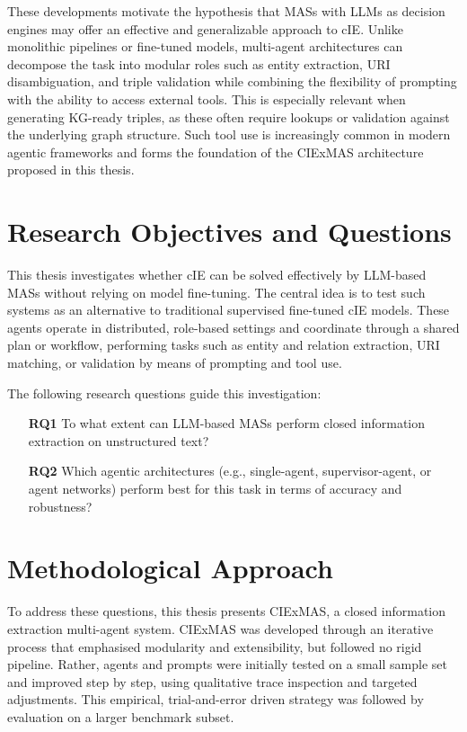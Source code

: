 \documentclass[a4paper,oneside,bibliography=totoc]{scrbook}
\begin{document}
These developments motivate the hypothesis that \acp{MAS} with \acp{LLM} as decision engines may offer an effective and generalizable approach to \ac{cIE}. Unlike monolithic pipelines or fine-tuned models, multi-agent architectures can decompose the task into modular roles such as entity extraction, URI disambiguation, and triple validation while combining the flexibility of prompting with the ability to access external tools. This is especially relevant when generating \ac{KG}-ready triples, as these often require lookups or validation against the underlying graph structure. Such tool use is increasingly common in modern agentic frameworks \cite{OpenAI2025} and forms the foundation of the CIExMAS architecture proposed in this thesis.

\section{Research Objectives and Questions}
\label{sec:research_questions}

This thesis investigates whether \ac{cIE} can be solved effectively by \ac{LLM}-based \acp{MAS} without relying on model fine-tuning. The central idea is to test such systems as an alternative to traditional supervised fine-tuned \ac{cIE} models. These agents operate in distributed, role-based settings and coordinate through a shared plan or workflow, performing tasks such as entity and relation extraction, URI matching, or validation by means of prompting and tool use.

The following research questions guide this investigation:

\begin{itemize}
  \item[\textbf{RQ1}] To what extent can \ac{LLM}-based \acp{MAS} perform closed information extraction on unstructured text?
  \item[\textbf{RQ2}] Which agentic architectures (e.g., single-agent, supervisor-agent, or agent networks) perform best for this task in terms of accuracy and robustness?
\end{itemize}

\section{Methodological Approach}
\label{sec:methodology}

To address these questions, this thesis presents CIExMAS, a closed information extraction multi-agent system. CIExMAS was developed through an iterative process that emphasised modularity and extensibility, but followed no rigid pipeline. Rather, agents and prompts were initially tested on a small sample set and improved step by step, using qualitative trace inspection and targeted adjustments. This empirical, trial-and-error driven strategy was followed by evaluation on a larger benchmark subset.
\end{document}
